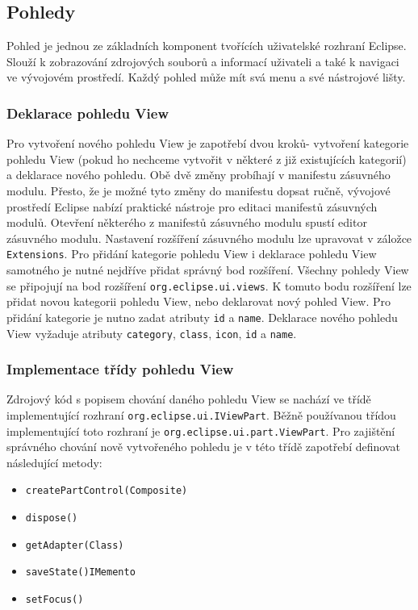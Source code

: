     \subsection{Pohledy}
    Pohled je jednou ze základních komponent tvořících uživatelské rozhraní Eclipse. Slouží k zobrazování zdrojových souborů a informací uživateli a také k navigaci ve vývojovém prostředí. Každý pohled může mít svá menu a své nástrojové lišty.

      \subsubsection{Deklarace pohledu View}
      Pro vytvoření nového pohledu View je zapotřebí dvou kroků- vytvoření kategorie pohledu View (pokud ho nechceme vytvořit v některé z již existujících kategorií) a deklarace nového pohledu. Obě dvě změny probíhají v manifestu zásuvného modulu. Přesto, že je možné tyto změny do manifestu dopsat ručně, vývojové prostředí Eclipse nabízí praktické nástroje pro editaci manifestů zásuvných modulů. Otevření některého z manifestů zásuvného modulu spustí editor zásuvného modulu. Nastavení rozšíření zásuvného modulu lze upravovat v záložce \texttt{Extensions}. Pro přidání kategorie pohledu View  i deklarace pohledu View samotného je nutné nejdříve přidat správný bod rozšíření. Všechny pohledy View se připojují na bod rozšíření \texttt{org.eclipse.ui.views}. K tomuto bodu rozšíření lze přidat novou kategorii pohledu View, nebo deklarovat nový pohled View. Pro přidání kategorie je nutno zadat atributy \texttt{id} a \texttt{name}. Deklarace nového pohledu View vyžaduje atributy \texttt{category}, \texttt{class}, \texttt{icon}, \texttt{id} a \texttt{name}. 
      
      \subsubsection{Implementace třídy pohledu View}
      Zdrojový kód s popisem chování daného pohledu View se nachází ve třídě implementující rozhraní \texttt{org.eclipse.ui.IViewPart}. Běžně používanou třídou implementující toto rozhraní je \texttt{org.eclipse.ui.part.ViewPart}. Pro zajištění správného chování nově vytvořeného pohledu je v této třídě zapotřebí definovat následující metody:
      \begin{itemize}
	\item \texttt{createPartControl(Composite)} 
	\item \texttt{dispose()}
	\item \texttt{getAdapter(Class)}
	\item \texttt{saveState()IMemento}
	\item \texttt{setFocus()}
      \end{itemize}

